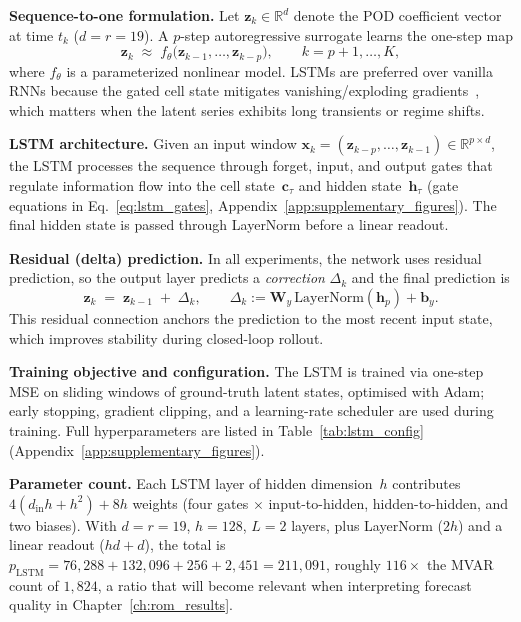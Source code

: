 \noindent\textbf{Sequence-to-one formulation.}
Let $\mathbf{z}_k\in\mathbb{R}^d$ denote the POD coefficient vector at
time $t_k$ ($d = r = 19$).
A $p$-step autoregressive surrogate learns the one-step map
\begin{equation}\label{eq:lstm_seq_problem}
  \mathbf{z}_{k} \;\approx\;
  f_\theta\!\bigl(\mathbf{z}_{k-1},\ldots,\mathbf{z}_{k-p}\bigr),
  \qquad k = p{+}1,\ldots,K,
\end{equation}
where $f_\theta$ is a parameterized nonlinear model.
LSTMs are preferred over vanilla RNNs because the gated cell state
mitigates vanishing/exploding gradients~\cite{hochreiter1997lstm}, which matters when the latent
series exhibits long transients or regime shifts.

\noindent\textbf{LSTM architecture.}
Given an input window
$\mathbf{x}_k = (\mathbf{z}_{k-p},\ldots,\mathbf{z}_{k-1})
\in\mathbb{R}^{p\times d}$,
the LSTM processes the sequence through forget, input, and output gates
that regulate information flow into the cell state~$\mathbf{c}_\tau$ and
hidden state~$\mathbf{h}_\tau$ (gate equations in
Eq.~\eqref{eq:lstm_gates}, Appendix~\ref{app:supplementary_figures}).
The final hidden state is passed through LayerNorm before a linear readout.

\noindent\textbf{Residual (delta) prediction.}
In all experiments, the network uses residual prediction, so
the output layer predicts a \emph{correction} $\Delta_k$ and the final
prediction is
\begin{equation}\label{eq:lstm_residual}
  \widehat{\mathbf{z}}_{k} \;=\;
  \mathbf{z}_{k-1} \;+\; \Delta_k,
  \qquad
  \Delta_k := \mathbf{W}_y\,\mathrm{LayerNorm}(\mathbf{h}_{p}) + \mathbf{b}_y.
\end{equation}
This residual connection anchors the prediction to the most recent input
state, which improves stability during closed-loop rollout.

\noindent\textbf{Training objective and configuration.}
The LSTM is trained via one-step MSE on sliding windows of
ground-truth latent states, optimised with Adam; early stopping,
gradient clipping, and a
learning-rate scheduler are used during training.
Full hyperparameters are listed in
Table~\ref{tab:lstm_config} (Appendix~\ref{app:supplementary_figures}).

\noindent\textbf{Parameter count.}
Each LSTM layer of hidden dimension~$h$ contributes
$4(d_{\mathrm{in}}h + h^2) + 8h$ weights (four gates $\times$
input-to-hidden, hidden-to-hidden, and two biases).
With $d{=}r{=}19$, $h{=}128$, $L{=}2$ layers, plus LayerNorm ($2h$) and
a linear readout ($hd+d$), the total is
$p_{\mathrm{LSTM}} = 76{,}288 + 132{,}096 + 256 + 2{,}451 = 211{,}091$, roughly
$116\times$ the MVAR count of $1{,}824$, a ratio that will become relevant
when interpreting forecast quality in Chapter~\ref{ch:rom_results}.

